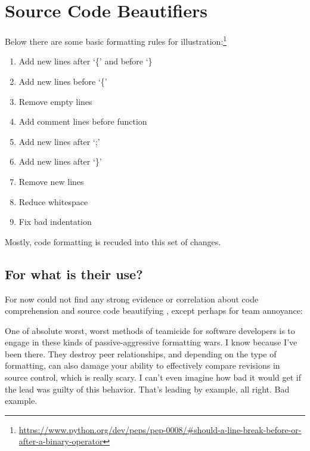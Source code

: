 

\chapter{Source Code Beautifiers}
\label{source_code_beautifiers}


Below there are some basic formatting rules for
illustration:\footnote{\url{https://www.python.org/dev/peps/pep-0008/#should-a-line-break-before-or-after-a-binary-operator}}

\medskip
\begin{enumerate}
    \item Add new lines after `\{' and before `\}
    \item Add new lines before `\{'
    \item Remove empty lines
    \item Add comment lines before function
    \item Add new lines after `;'
    \item Add new lines after `\}'
    \item Remove new lines
    \item Reduce whitespace
    \item Fix bad indentation
\end{enumerate}
\vspace{-4mm}\begin{flushright}\textcite{prettyPrinter}\end{flushright}

Mostly,
code formatting is recuded into this set of changes.



\section{For what is their use?}

For now could not find any strong evidence or correlation about code
comprehension and source code beautifying \cite{improvingCodeReadability},
except perhaps for team annoyance:

\begin{citacao}
One of absolute worst, worst methods of teamicide for software developers is to engage
in these kinds of passive-aggressive formatting wars. I know because I've been there.
They destroy peer relationships, and depending on the type of formatting, can also damage
your ability to effectively compare revisions in source control, which is really scary.
I can't even imagine how bad it would get if the lead was guilty of this behavior. That's
leading by example, all right. Bad example. \cite{Atwood}
\end{citacao}

